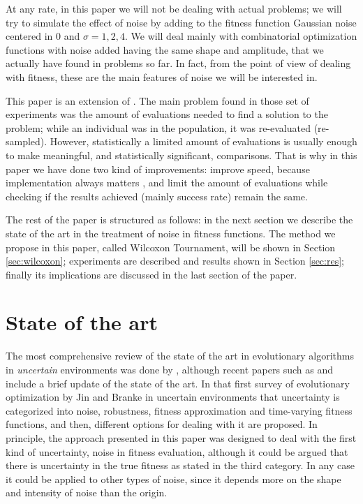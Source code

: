\documentclass{llncs}
\begin{document}
At any rate, in this paper we will not be dealing with actual
problems; we will try to simulate the effect of noise by adding to the fitness function Gaussian noise centered in 0 and $\sigma=1,2,4$. We will deal mainly with combinatorial optimization functions with noise added having the same shape and amplitude,
that we actually have found in problems so far. In fact, from the
point of view of dealing with fitness, these are the main features of
noise we will be interested in. 

This paper is an extension of \cite{merelo14:noisy}. The main problem
found in those set of experiments was the amount of evaluations needed
to find a solution to the problem; while an individual was in the
population, it was re-evaluated (re-sampled). However, statistically a
limited amount of evaluations is usually enough to make meaningful,
and statistically significant, comparisons. That is why in this paper
we have done two kind of improvements: improve speed, because
implementation always matters
\cite{DBLP:conf/iwann/MereloRACML11},
and limit the amount of evaluations while checking if the results
achieved (mainly success rate) remain the same.  

The rest of the paper is structured as follows: in the next section we describe the
state of the art in the treatment of noise in fitness functions. The
method we propose in this paper, called Wilcoxon Tournament, will be
shown in Section \ref{sec:wilcoxon}; experiments are described and
results shown in Section \ref{sec:res}; finally its implications are discussed in the last section of the paper. 


\section{State of the art}
\label{sec:soa}

\sloppypar The most comprehensive review of the state of the art in evolutionary
algorithms in {\em uncertain} environments 
was done by %
\cite{Jin2005303}, although recent
papers such as \cite{DBLP:journals/corr/QianYZ13,6931307} and \cite{Qian:sampling} include a brief update of the state
of the art. In that first survey 
of evolutionary optimization by Jin and Branke  in
uncertain environments that uncertainty is categorized into noise,
robustness, fitness approximation and time-varying fitness functions, and then,
different options for dealing with it are proposed. In principle, the
approach presented in this paper was designed to deal with the first kind of
uncertainty, noise in fitness evaluation, although it could be argued
that there is uncertainty in the true fitness as stated in the third
category. In any case it could be applied to
other types of noise, since it depends more on the shape and intensity
of noise than the origin. 
\end{document}

